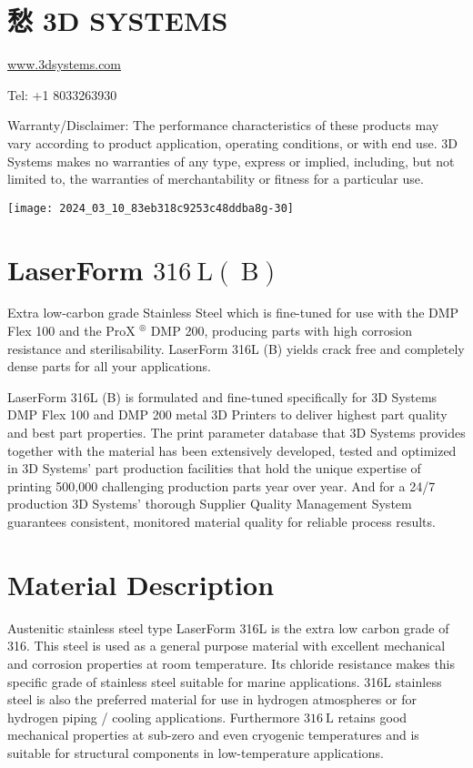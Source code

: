 \documentclass[10pt]{article}
\begin{document}
\section*{愁 3D SYSTEMS}
\href{http://www.3dsystems.com}{www.3dsystems.com}

Tel: +1 8033263930

Warranty/Disclaimer: The performance characteristics of these products may vary according to product application, operating conditions, or with end use. 3D Systems makes no warranties of any type, express or implied, including, but not limited to, the warranties of merchantability or fitness for a particular use.

\begin{center}
\texttt{[image: 2024\_03\_10\_83eb318c9253c48ddba8g-30]}
\end{center}

\section*{LaserForm $316 \mathrm{~L}(\mathrm{~B})$}
Extra low-carbon grade Stainless Steel which is fine-tuned for use with the DMP Flex 100 and the ProX ${ }^{\circledR}$ DMP 200, producing parts with high corrosion resistance and sterilisability. LaserForm 316L (B) yields crack free and completely dense parts for all your applications.

LaserForm 316L (B) is formulated and fine-tuned specifically for 3D Systems DMP Flex 100 and DMP 200 metal 3D Printers to deliver highest part quality and best part properties. The print parameter database that 3D Systems provides together with the material has been extensively developed, tested and optimized in 3D Systems' part production facilities that hold the unique expertise of printing 500,000 challenging production parts year over year. And for a 24/7 production 3D Systems' thorough Supplier Quality Management System guarantees consistent, monitored material quality for reliable process results.

\section*{Material Description}
Austenitic stainless steel type LaserForm 316L is the extra low carbon grade of 316. This steel is used as a general purpose material with excellent mechanical and corrosion properties at room temperature. Its chloride resistance makes this specific grade of stainless steel suitable for marine applications. 316L stainless steel is also the preferred material for use in hydrogen atmospheres or for hydrogen piping / cooling applications. Furthermore $316 \mathrm{~L}$ retains good mechanical properties at sub-zero and even cryogenic temperatures and is suitable for structural components in low-temperature applications.
\end{document}
